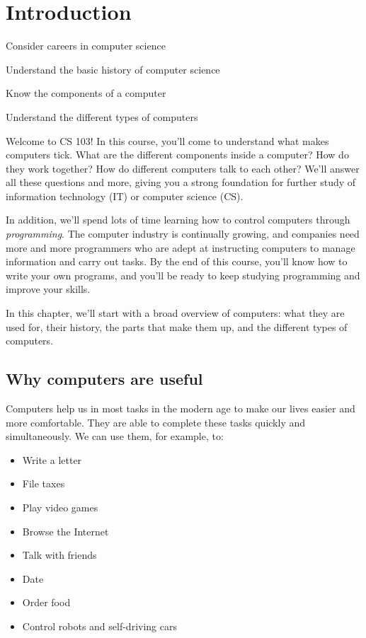 \chapter{Introduction}

\begin{goals}
\item Consider careers in computer science
\item Understand the basic history of computer science
\item Know the components of a computer
\item Understand the different types of computers
\end{goals}

Welcome to CS 103! In this course, you'll come to understand what makes computers tick. What are the different components inside a computer? How do they work together? How do different computers talk to each other? We'll answer all these questions and more, giving you a strong foundation for further study of information technology (IT) or computer science (CS). 

In addition, we'll spend lots of time learning how to control computers through \emph{programming}. The computer industry is continually growing, and companies need more and more programmers who are adept at instructing computers to manage information and carry out tasks. By the end of this course, you'll know how to write your own programs, and you'll be ready to keep studying programming and improve your skills.

In this chapter, we'll start with a broad overview of computers: what they are used for, their history, the parts that make them up, and the different types of computers.

\section{Why computers are useful}

Computers help us in most tasks in the modern age to make our lives easier and more comfortable. They are able to complete these tasks quickly and simultaneously. We can use them, for example, to:

\begin{itemize}
	\item Write a letter
	\item File taxes
	\item Play video games
	\item Browse the Internet
	\item Talk with friends
	\item Date
	\item Order food
	\item Control robots and self-driving cars
\end{itemize}


